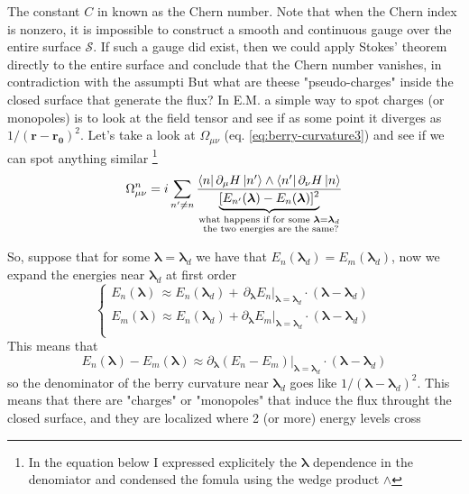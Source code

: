 \documentclass[11pt,a4paper]{report}
\theoremstyle{definition}
\theoremstyle{plain}
\theoremstyle{plain}
\begin{document}
			The constant $C$ in known as the Chern number. Note that when the Chern index is nonzero, it is impossible to construct a smooth and continuous gauge over the entire surface $\mathcal{S}$. If such a gauge did exist, then we could apply Stokes’ theorem directly to the entire surface and conclude that the Chern number vanishes, in contradiction with the assumpti\newline
			But what are theese "pseudo-charges" inside the closed surface that generate the flux?\newline
			In E.M. a simple way to spot charges (or monopoles) is to look at the field tensor and see if as some point it diverges as $1/(\mathbf r-\mathbf{r_0})^2$. Let's take a look at $\Omega_{\mu\nu}$ (eq. \ref{eq:berry-curvature3}) and see if we can spot anything similar \footnote{In the equation below I expressed explicitely the $\boldsymbol \lambda$ dependence in the denomiator and condensed the fomula using the wedge product $\wedge$}
			\begin{equation}
				\label{eq:monopoles1}
				\Omega_{\mu\nu}^n=i\sum_{n'\neq n} \frac{\bra{n}\partial_\mu H\ket{n'}\wedge \bra{n'} \partial_\nu H\ket{n}}
				{\underbrace{[E_{n'}(\boldsymbol \lambda)-E_n(\boldsymbol \lambda)]^2}_
				{\substack{\text{what happens if for some } \boldsymbol \lambda=\boldsymbol \lambda_d  \\\text{ the two energies are the same?}}}}
			\end{equation}

			So, suppose that for some $\boldsymbol \lambda=\boldsymbol \lambda_d$ we have that $E_n (\boldsymbol \lambda_d)=E_m(\boldsymbol \lambda_d)$, now we expand the energies near $\boldsymbol \lambda_d$ at first order
			\[
			\begin{cases}
			E_n(\boldsymbol \lambda)\, \approx E_n(\boldsymbol \lambda_d) +\, \partial_{\boldsymbol \lambda} E_n|_{\boldsymbol \lambda =\boldsymbol \lambda_d}\cdot (\boldsymbol \lambda-\boldsymbol \lambda_d)\\
			E_m(\boldsymbol \lambda)\approx E_n(\boldsymbol \lambda_d) + \partial_{\boldsymbol \lambda} E_m|_{\boldsymbol \lambda =\boldsymbol \lambda_d}\cdot (\boldsymbol \lambda-\boldsymbol \lambda_d)\\

			\end{cases}
			\]
			This means that 
			\[
			E_n(\boldsymbol \lambda)-E_m(\boldsymbol \lambda)\approx \partial_{\boldsymbol \lambda} (E_n-E_m)|_{\boldsymbol \lambda =\boldsymbol \lambda_d}\cdot (\boldsymbol \lambda-\boldsymbol \lambda_d)
			\]
			so the denominator of the berry curvature near $\boldsymbol \lambda_d$ goes like $ 1/(\boldsymbol \lambda-\boldsymbol \lambda_d)^2$.\newline
			This means that there are "charges" or "monopoles" that induce the flux throught the closed surface, and they are localized where 2 (or more) energy levels cross

		
\end{document}

